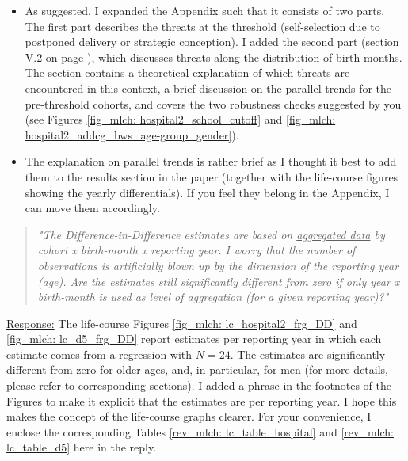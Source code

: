 \begin{itemize}
	\item As suggested, I expanded the Appendix such that it consists of two parts. The first part describes the threats at the threshold (self-selection due to postponed delivery or strategic conception). I added the second part (section V.2 on page \pageref{rev_mlch:threats_birth_months}), which discusses threats along the distribution of birth months. The section contains a theoretical explanation of which threats are encountered in this context, a brief discussion on the parallel trends for the pre-threshold cohorts, and covers the two robustness checks suggested by you (see Figures \ref{fig_mlch: hospital2_school_cutoff} and \ref{fig_mlch: hospital2_addcg_bws_age-group_gender}). 
	\item The explanation on parallel trends is rather brief as I thought it best to add them to the results section in the paper (together with the life-course figures showing the yearly differentials). If you feel they belong in the Appendix, I can move them accordingly.
\end{itemize}


\begin{quote}
	\textit{"The Difference-in-Difference estimates are based on \underline{aggregated data} by cohort x birth-month x reporting year. I worry that the number of observations is artificially blown up by the dimension of the reporting year (age). Are the estimates still significantly different from zero if only year x birth-month is used as level of aggregation (for a given reporting year)?"}
\end{quote}
\underline{Response:} The life-course Figures \ref{fig_mlch: lc_hospital2_frg_DD} and \ref{fig_mlch: lc_d5_frg_DD} report estimates per reporting year in which each estimate comes from a regression with $N=24$. The estimates are significantly different from zero for older ages, and, in particular, for men (for more details, please refer to corresponding sections). I added a phrase in the footnotes of the Figures to make it explicit that the estimates are per reporting year. I hope this makes the concept of the life-course graphs clearer. For your convenience, I enclose the corresponding Tables \ref{rev_mlch: lc_table_hospital} and \ref{rev_mlch: lc_table_d5} here in the reply.







